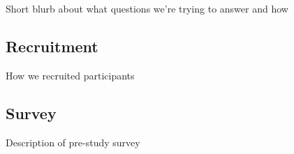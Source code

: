 Short blurb about what questions we're trying to answer and how
% 
\subsection{Recruitment} 
How we recruited participants



\subsection{Survey} 
Description of pre-study survey

 
